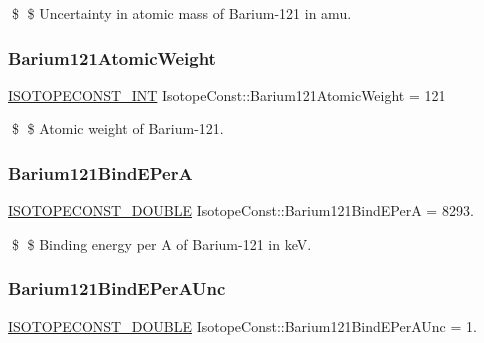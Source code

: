 \$ \$ Uncertainty in atomic mass of Barium-\/121 in amu. \mbox{\label{group___isotope_const-_barium-_ba121_ga8d9847d91a0cab4f43895e2933414fe3}} 
\subsubsection{\texorpdfstring{Barium121\+Atomic\+Weight}{Barium121AtomicWeight}}
{\footnotesize\ttfamily \mbox{\hyperlink{group___isotope_const-_macros_ga5f18360b3e99483a35c32d789e62621c}{I\+S\+O\+T\+O\+P\+E\+C\+O\+N\+S\+T\+\_\+\+I\+NT}} Isotope\+Const\+::\+Barium121\+Atomic\+Weight = 121}

\$ \$ Atomic weight of Barium-\/121. \mbox{\label{group___isotope_const-_barium-_ba121_gafda3d6317131d8c322f77f5024bd0339}} 
\subsubsection{\texorpdfstring{Barium121\+Bind\+E\+PerA}{Barium121BindEPerA}}
{\footnotesize\ttfamily \mbox{\hyperlink{group___isotope_const-_macros_ga8f45a7272ce02c0b4c65c44636ed719a}{I\+S\+O\+T\+O\+P\+E\+C\+O\+N\+S\+T\+\_\+\+D\+O\+U\+B\+LE}} Isotope\+Const\+::\+Barium121\+Bind\+E\+PerA = 8293.}

\$ \$ Binding energy per A of Barium-\/121 in keV. \mbox{\label{group___isotope_const-_barium-_ba121_ga3cff453e81d34aa2106bb8ea929ea8c2}} 
\subsubsection{\texorpdfstring{Barium121\+Bind\+E\+Per\+A\+Unc}{Barium121BindEPerAUnc}}
{\footnotesize\ttfamily \mbox{\hyperlink{group___isotope_const-_macros_ga8f45a7272ce02c0b4c65c44636ed719a}{I\+S\+O\+T\+O\+P\+E\+C\+O\+N\+S\+T\+\_\+\+D\+O\+U\+B\+LE}} Isotope\+Const\+::\+Barium121\+Bind\+E\+Per\+A\+Unc = 1.}

